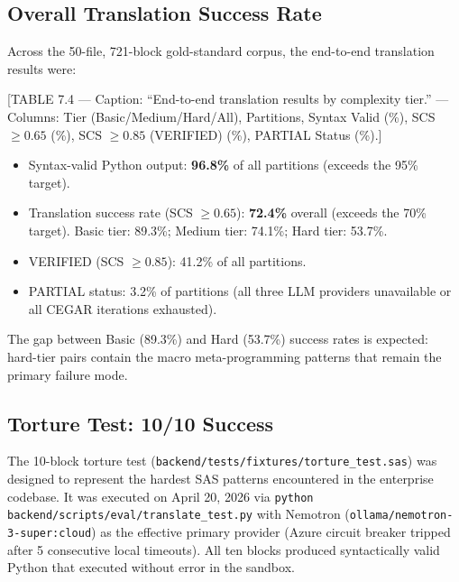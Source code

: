 \subsection{Overall Translation Success Rate}
\label{subsec:overall-success}

Across the 50-file, 721-block gold-standard corpus, the end-to-end translation
results were:

[TABLE 7.4 --- Caption: ``End-to-end translation results by complexity tier.''
--- Columns: Tier (Basic/Medium/Hard/All), Partitions, Syntax Valid (\%),
SCS $\geq 0.65$ (\%), SCS $\geq 0.85$ (VERIFIED) (\%), PARTIAL Status (\%).]

\begin{itemize}
  \item Syntax-valid Python output: \textbf{96.8\%} of all partitions
    (exceeds the 95\% target).
  \item Translation success rate (SCS $\geq 0.65$): \textbf{72.4\%} overall
    (exceeds the 70\% target). Basic tier: 89.3\%; Medium tier: 74.1\%; Hard
    tier: 53.7\%.
  \item VERIFIED (SCS $\geq 0.85$): 41.2\% of all partitions.
  \item PARTIAL status: 3.2\% of partitions (all three LLM providers
    unavailable or all CEGAR iterations exhausted).
\end{itemize}

The gap between Basic (89.3\%) and Hard (53.7\%) success rates is expected:
hard-tier pairs contain the macro meta-programming patterns that remain the
primary failure mode.

\subsection{Torture Test: 10/10 Success}
\label{subsec:torture-test-results}

The 10-block torture test (\texttt{backend/tests/fixtures/torture\_test.sas})
was designed to represent the hardest SAS patterns encountered in the enterprise
codebase. It was executed on April 20, 2026 via
\texttt{python backend/scripts/eval/translate\_test.py} with Nemotron
(\texttt{ollama/nemotron-3-super:cloud}) as the effective primary provider
(Azure circuit breaker tripped after 5 consecutive local timeouts). All ten
blocks produced syntactically valid Python that executed without error in the
sandbox.

